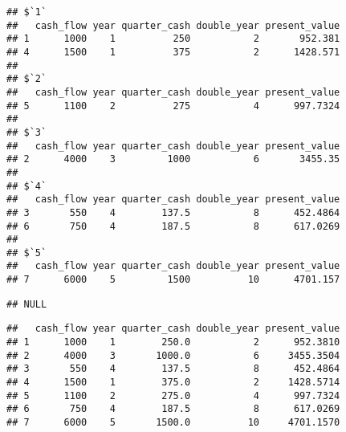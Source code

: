 \documentclass[]{article}
\newenvironment{Shaded}{\begin{snugshade}}{\end{snugshade}}
\newcommand{\KeywordTok}[1]{\textcolor[rgb]{0.13,0.29,0.53}{\textbf{#1}}}
\newcommand{\DecValTok}[1]{\textcolor[rgb]{0.00,0.00,0.81}{#1}}
\newcommand{\StringTok}[1]{\textcolor[rgb]{0.31,0.60,0.02}{#1}}
\newcommand{\CommentTok}[1]{\textcolor[rgb]{0.56,0.35,0.01}{\textit{#1}}}
\newcommand{\OperatorTok}[1]{\textcolor[rgb]{0.81,0.36,0.00}{\textbf{#1}}}
\newcommand{\NormalTok}[1]{#1}
\begin{document}
\begin{verbatim}
## $`1`
##   cash_flow year quarter_cash double_year present_value
## 1      1000    1          250           2       952.381
## 4      1500    1          375           2      1428.571
## 
## $`2`
##   cash_flow year quarter_cash double_year present_value
## 5      1100    2          275           4      997.7324
## 
## $`3`
##   cash_flow year quarter_cash double_year present_value
## 2      4000    3         1000           6       3455.35
## 
## $`4`
##   cash_flow year quarter_cash double_year present_value
## 3       550    4        137.5           8      452.4864
## 6       750    4        187.5           8      617.0269
## 
## $`5`
##   cash_flow year quarter_cash double_year present_value
## 7      6000    5         1500          10      4701.157
\end{verbatim}

\begin{Shaded}
\end{Shaded}

\begin{verbatim}
## NULL
\end{verbatim}

\begin{Shaded}
\end{Shaded}

\begin{verbatim}
##   cash_flow year quarter_cash double_year present_value
## 1      1000    1        250.0           2      952.3810
## 2      4000    3       1000.0           6     3455.3504
## 3       550    4        137.5           8      452.4864
## 4      1500    1        375.0           2     1428.5714
## 5      1100    2        275.0           4      997.7324
## 6       750    4        187.5           8      617.0269
## 7      6000    5       1500.0          10     4701.1570
\end{verbatim}
\end{document}
